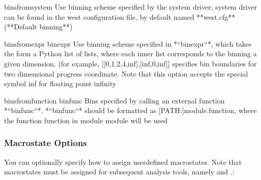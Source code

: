 \documentclass[letterpaper,10pt,english]{sphinxmanual}
\begin{document}
\begin{sphinxVerbatim}[commandchars=\\\{\}]
\PYGZhy{}\PYGZhy{}bins\PYGZhy{}from\PYGZhy{}system
  Use binning scheme specified by the system driver; system driver can be
  found in the west configuration file, by default named **west.cfg**
  (**Default binning**)

\PYGZhy{}\PYGZhy{}bins\PYGZhy{}from\PYGZhy{}expr bin\PYGZus{}expr
  Use binning scheme specified in *``bin\PYGZus{}expr``*, which takes the form a
  Python list of lists, where each inner list corresponds to the binning a
  given dimension. (for example, \PYGZdq{}[[0,1,2,4,inf],[\PYGZhy{}inf,0,inf]]\PYGZdq{} specifies bin
  boundaries for two dimensional progress coordinate. Note that this option
  accepts the special symbol \PYGZsq{}inf\PYGZsq{} for floating point infinity

\PYGZhy{}\PYGZhy{}bins\PYGZhy{}from\PYGZhy{}function bin\PYGZus{}func
  Bins specified by calling an external function *``bin\PYGZus{}func``*.
  *``bin\PYGZus{}func``* should be formatted as \PYGZsq{}[PATH:]module.function\PYGZsq{}, where the
  function \PYGZsq{}function\PYGZsq{} in module \PYGZsq{}module\PYGZsq{} will be used
\end{sphinxVerbatim}


\subsubsection{Macrostate Options}
\label{\detokenize{users_guide/command_line_tools/w_assign:macrostate-options}}
You can optionally specify how to assign user\sphinxhyphen{}defined macrostates. Note
that macrostates must be assigned for subsequent analysis tools, namely
 and .:
\end{document}

